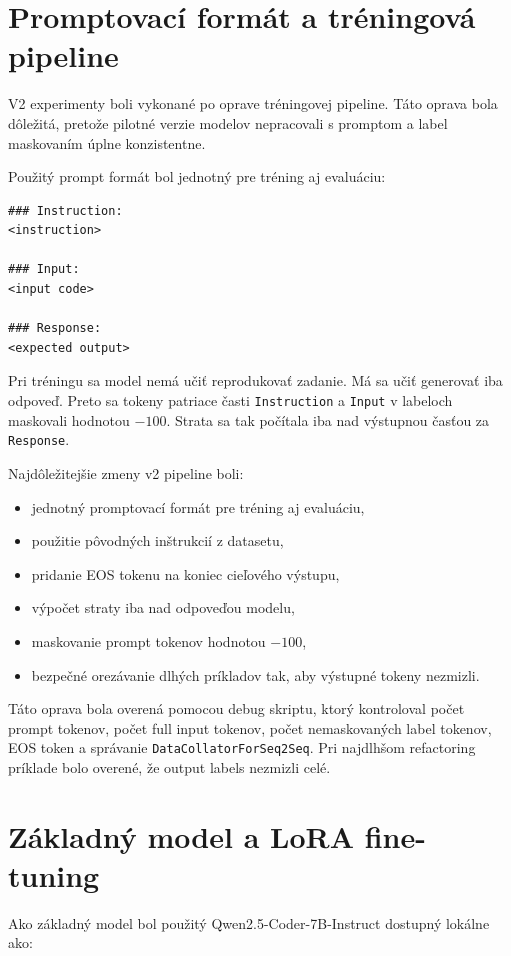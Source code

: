 \documentclass[11pt,a4paper]{article}
\begin{document}
\section{Promptovací formát a tréningová pipeline}

V2 experimenty boli vykonané po oprave tréningovej pipeline. Táto oprava bola dôležitá, pretože pilotné verzie modelov nepracovali s promptom a label maskovaním úplne konzistentne.

Použitý prompt formát bol jednotný pre tréning aj evaluáciu:

\begin{lstlisting}
### Instruction:
<instruction>

### Input:
<input code>

### Response:
<expected output>
\end{lstlisting}

Pri tréningu sa model nemá učiť reprodukovať zadanie. Má sa učiť generovať iba odpoveď. Preto sa tokeny patriace časti \texttt{Instruction} a \texttt{Input} v labeloch maskovali hodnotou $-100$. Strata sa tak počítala iba nad výstupnou časťou za \texttt{Response}.

Najdôležitejšie zmeny v2 pipeline boli:
\begin{itemize}
\item jednotný promptovací formát pre tréning aj evaluáciu,
\item použitie pôvodných inštrukcií z datasetu,
\item pridanie EOS tokenu na koniec cieľového výstupu,
\item výpočet straty iba nad odpoveďou modelu,
\item maskovanie prompt tokenov hodnotou $-100$,
\item bezpečné orezávanie dlhých príkladov tak, aby výstupné tokeny nezmizli.
\end{itemize}

Táto oprava bola overená pomocou debug skriptu, ktorý kontroloval počet prompt tokenov, počet full input tokenov, počet nemaskovaných label tokenov, EOS token a správanie \texttt{DataCollatorForSeq2Seq}. Pri najdlhšom refactoring príklade bolo overené, že output labels nezmizli celé.

\section{Základný model a LoRA fine-tuning}

Ako základný model bol použitý Qwen2.5-Coder-7B-Instruct dostupný lokálne ako:
\end{document}

